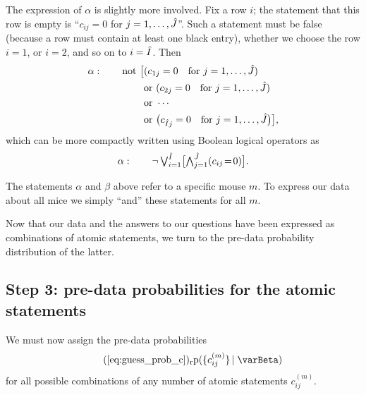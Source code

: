 \documentclass[\ifafour a4paper,12pt,\else a5paper,10pt,\fi%
onecolumn,oneside,article,%
british%
]{memoir}
\theoremstyle{remark}
\theoremstyle{innote}
\newcommand*{\pf}{\mathrm{p}}%
\renewcommand*{\|}[1][]{\nonscript\,#1\vert\nonscript\;\mathopen{}}
\newcommand*{\labelbis}[1]{\tag*{(\ref{#1})$_\text{r}$}}
\newcommand*{\tland}{\mathop{\textstyle\bigwedge}\nolimits}
\newcommand*{\tlor}{\mathop{\textstyle\bigvee}\nolimits}
\newcommand*{\yI}{\varBeta}
\newcommand*{\eq}{\mathrel{\!=\!}}
\newcommand*{\ycm}[1][m]{c^{(#1)}}
\DeclarePairedDelimiter\tu{\{}{\}}
\newcommand*{\yIh}{\Hat{I}}
\newcommand*{\yJh}{\Hat{J}}
\newcommand*{\ka}{\alpha}
\newcommand*{\kb}{\beta}
\begin{document}
The expression of $\ka$ is slightly more involved. Fix a row $i$; the
statement that this row is empty is \enquote{$c_{ij}=0$ for
  $j=1, \dotsc, \yJh$}. Such a statement must be false (because a row must
contain at least one black entry), whether we choose the row $i=1$, or
$i=2$, and so on to $i=\yIh$. Then
\begin{equation}
  \label{eq:alpha_and}
  \begin{aligned}
  \ka:\qquad \text{not }\bigl[ &(c_{1j} =0 \quad\text{for }j=1,\dotsc,\yJh)
\\  &\text{or }
  (c_{2j} =0 \quad\text{for }j=1,\dotsc,\yJh)
    \\  &\text{or } \dotsb
    \\&\text{or }
  \bigl(c_{\yIh j} =0 \quad\text{for }j=1,\dotsc,\yJh \bigr)\bigr],
  \end{aligned}
\end{equation}
which can be more compactly written using Boolean logical operators as
\begin{equation}
  \label{eq:alpha_and_boole}
    \ka:\qquad \lnot \tlor_{i=1}^{\yIh} \bigl[
\tland_{j=1}^{\yJh} (c_{ij} \eq 0)
    \bigr].
\end{equation}

\medskip

The statements $\ka$ and $\kb$ above refer to a specific mouse $m$. To
express our data about all mice we simply \enquote{and} these statements
for all $m$.

Now that our data and the answers to our questions have been expressed as
combinations of atomic statements, we turn to the pre-data probability
distribution of the latter.


\subsection{Step 3: pre-data probabilities for the atomic statements}
\label{sec:step_joint_prob}

We must now assign the pre-data probabilities
\begin{equation}
  \labelbis{eq:guess_prob_c}
  \pf(\tu{\ycm_{ij}} \| \yI)
\end{equation}
for all possible combinations of any number of atomic statements
$\ycm_{ij}$.
\end{document}
